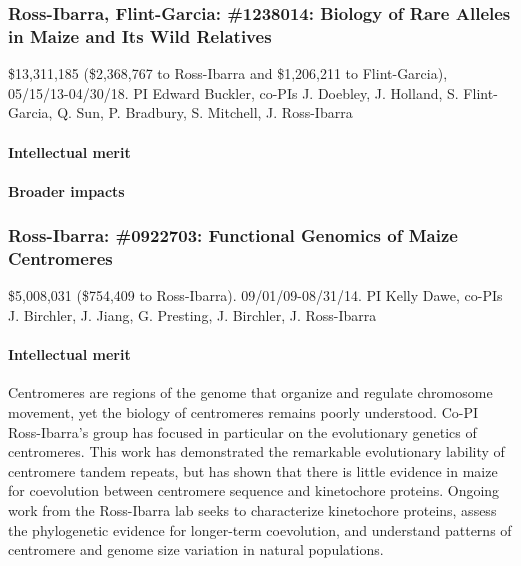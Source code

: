 
\subsubsection*{Ross-Ibarra, Flint-Garcia: \#1238014: Biology of Rare Alleles in Maize and Its Wild Relatives}
\$13,311,185 (\$2,368,767 to Ross-Ibarra and \$1,206,211 to Flint-Garcia), 05/15/13-04/30/18. PI Edward Buckler, co-PIs J. Doebley, J. Holland, S. Flint-Garcia, Q. Sun, P. Bradbury, S. Mitchell, J. Ross-Ibarra
\paragraph*{Intellectual merit}
\paragraph*{Broader impacts}

\citealt{Hufford2012b}
\citealt{Ross-Ibarra2009a}
\citealt{Studer2011b}
\citealt{Shi2010a}
\citealt{vanheerwaarden2010a}
\citealt{vanheerwaarden2010b}
\citealt{vanheerwaarden2011a}
\citealt{Morrell2011a}
\citealt{Cook2012a}
\citealt{Fang2012a}
\citealt{Chia2012a}
\citealt{Gore2009}
\citealt{Hufford2012}
\citealt{Kanizay2013}
\citealt{Hufford2013}
\citealt{Melters2013a}
\citealt{Mezmouk2014}
\citealt{Pyhajarvi2013}
\citealt{Tian2011}
\citealt{Hung2012}
\citealt{Buckler2009}
\citealt{Brown2011b}
\citealt{McMullen2009}
\citealt{Peiffer2014}
\citealt{Romay2013}
\citealt{Hung2012a}
\citealt{Bottoms2010}
\citealt{Dubois2010}
\citealt{Zhang2010a}
\citealt{Flint-Garcia2009}
\citealt{Flint-Garcia2009a}
\citealt{Flint-Garcia2009b}

\subsubsection*{Ross-Ibarra: \#0922703: Functional Genomics of Maize Centromeres}
\$5,008,031 (\$754,409 to Ross-Ibarra). 09/01/09-08/31/14. PI Kelly Dawe, co-PIs J. Birchler, J. Jiang, G. Presting, J. Birchler, J. Ross-Ibarra

\paragraph*{Intellectual merit} Centromeres are regions of the genome that organize and regulate chromosome movement, yet the biology of centromeres remains poorly understood. Co-PI Ross-Ibarra's group has focused in particular on the evolutionary genetics of centromeres. This work has demonstrated the remarkable evolutionary lability of centromere tandem repeats, but has shown that there is little evidence in maize for coevolution between centromere sequence and kinetochore proteins. Ongoing work from the Ross-Ibarra lab seeks to characterize kinetochore proteins, assess the phylogenetic evidence for longer-term coevolution, and understand patterns of centromere and genome size variation in natural populations. 
